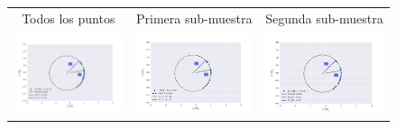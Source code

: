 \begin{figure}
\begin{tabular}{@{}c@{}c@{}c@{}}
Todos los puntos & Primera sub-muestra & Segunda sub-muestra \\ \includegraphics[clip]{./Figures/LV-bowshocks-xyfancy-positionswill-177-341} & \includegraphics[clip]{./Figures/LV-bowshocks-xyfancy-positionssamp00-177-341} &
\includegraphics[clip]{./Figures/LV-bowshocks-xyfancy-positionssamp01-177-341} \\

\end{tabular}
\end{figure}
